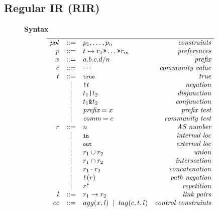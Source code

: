 \subsection{Regular IR (RIR)}
\label{sec:rir}


\newcommand{\BNFALT}{\;\;|\;\;}
\newcommand{\hdr}[2]{\flushleft \chdr{\hspace{5mm}#1}{#2}}
\newcommand{\chdr}[2]{\textbf{#1} {#2} \\ \centering}

\begin{figure}\small
  \begin{minipage}[t]{.45\linewidth}
  \hdr{\large Syntax}{}
  \vspace*{-1\baselineskip}
  \[ \begin{array}{rclr}
    \hline

     pol     &::=& p_1, \dots, p_n & \textit{constraints} \\
     p       &::=& t \mapsto r_1 \Prefer \dots \Prefer r_m & \textit{preferences} \\
     x       &::=& a.b.c.d/n & \textit{prefix} \\
     c       &::=& \cdots & \textit{community value} \\
     t       &::=& \True & \textit{true} \\
         &\BNFALT& \NOT t & \textit{negation} \\
         &\BNFALT& t_1 \OR{} t_2 & \textit{disjunction} \\
         &\BNFALT& t_1 \AND{} t_2 & \textit{conjunction} \\
         &\BNFALT& \textit{prefix} = x & \textit{prefix test} \\
         &\BNFALT& \textit{comm} = c & \textit{community test} \\
     r       &::=& n & \textit{AS number} \\
         &\BNFALT& \In & \textit{internal loc} \\
         &\BNFALT& \Out & \textit{external loc} \\
         &\BNFALT& r_1 \cup r_2 & \textit{union} \\
         &\BNFALT& r_1 \cap r_2 & \textit{intersection} \\
         &\BNFALT& r_1 \cdot r_2 & \textit{concatenation} \\
         &\BNFALT& \NOT(r) & \textit{path negation} \\
         &\BNFALT& r^* & \textit{repetition} \\
     l       &::=& r_1 \rightarrow r_2 & \textit{link pairs} \\
     cc     &::=& agg(x, l) \BNFALT tag(c, t, l) & \textit{control constraints} \\
  \end{array} \]


\end{minipage}
\end{figure}
